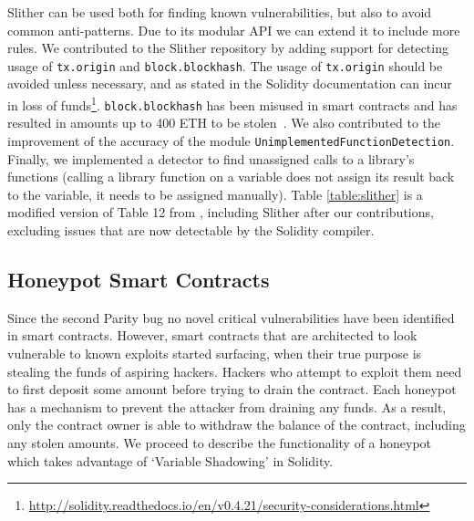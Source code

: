 Slither can be used both for finding known vulnerabilities, but also to avoid common anti-patterns. Due to its modular API we can extend it to include more rules. We contributed to the Slither repository by adding support for detecting usage of \texttt{tx.origin} and \texttt{block.blockhash}. The usage of \texttt{tx.origin} should be avoided unless necessary, and as stated in the Solidity documentation can incur in loss of funds\footnote{\url{http://solidity.readthedocs.io/en/v0.4.21/security-considerations.html}}. \texttt{block.blockhash} has been misused in smart contracts and has resulted in amounts up to 400 ETH to be stolen~\cite{smartbillions}. We also contributed to the improvement of the accuracy of the module \texttt{UnimplementedFunctionDetection}. Finally, we implemented a detector to find unassigned calls to a library's functions (calling a library function on a variable does not assign its result back to the variable, it needs to be assigned manually). Table \ref{table:slither} is a modified version of Table 12 from \cite{tools}, including Slither after our contributions, excluding issues that are now detectable by the Solidity compiler. %



\subsection{Honeypot Smart Contracts} \label{honeypots}
Since the second Parity bug no novel critical vulnerabilities have been identified in smart contracts. However, smart contracts that are architected to look vulnerable to known exploits started surfacing, when their true purpose is stealing the funds of aspiring hackers. %
Hackers who attempt to exploit them need to first deposit some amount before trying to drain the contract. Each honeypot has a mechanism to prevent the attacker from draining any funds. As a result, only the contract owner is able to withdraw the balance of the contract, including any stolen amounts. %
We proceed to describe the functionality of a honeypot which takes advantage of `Variable Shadowing' in Solidity. 

